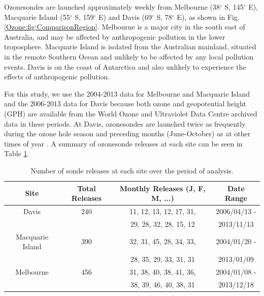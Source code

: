     Ozonesondes are launched approximately weekly from Melbourne (38$^{\circ}$ S, 145$^{\circ}$ E), Macquarie Island (55$^{\circ}$ S, 159$^{\circ}$ E) and Davis (69$^{\circ}$ S, 78$^{\circ}$ E), as shown in Fig. \ref{Ozone:fig:ComparisonRegion}. 
    Melbourne is a major city in the south east of Australia, and may be affected by anthropogenic pollution in the lower troposphere.
    Macquarie Island is isolated from the Australian mainland, situated in the remote Southern Ocean and unlikely to be affected by any local pollution events.
    Davis is on the coast of Antarctica and also unlikely to experience the effects of anthropogenic pollution.
    
    For this study, we use the 2004-2013 data for Melbourne and Macquarie Island and the 2006-2013 data for Davis because both ozone and geopotential height (GPH) are available from the World Ozone and Ultraviolet Data Centre archived data in these periods.
    At Davis, ozonesondes are launched twice as frequently during the ozone hole season and preceding months (June-October) as at other times of year \citep{Alexander2013}.
    A summary of ozonesonde releases at each site can be seen in Table \ref{Ozone:fig:sondesummary}.
    
    \begin{table}[t]
      \caption{Number of sonde releases at each site over the period of analysis.}
      \begin{tabular}{ c   c   c   c  } 
        \hline
        Site 		 & Total Releases & Monthly Releases (J, F, M, ...) & Date Range \\
        \hline
        Davis		 & 240	& 11, 12, 13, 12, 17, 31,	& 2006/04/13 -  \\ 
        &	& 29, 28, 32, 28, 15, 12 	& 2013/11/13	\\
        Macquarie Island & 390	& 32, 31, 45, 28, 34, 33,	& 2004/01/20 -  \\
        &	& 28, 35, 29, 33, 31, 31 	& 2013/01/09	\\ 
        Melbourne 	 & 456	& 31, 38, 40, 38, 41, 36,	& 2004/01/08 -  \\
        &	& 38, 39, 46, 40, 38, 31 	& 2013/12/18	\\
        \hline
      \end{tabular}
      \label{Ozone:fig:sondesummary}
    \end{table}
    

